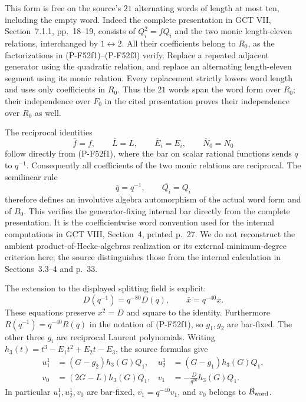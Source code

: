 This form is free on the source's $21$ alternating words of
length at most ten, including the empty word. Indeed the
complete presentation in GCT VII, Section~7.1.1, pp.~18--19,
consists of $Q_i^2=fQ_i$ and the two monic length-eleven
relations, interchanged by $1\leftrightarrow2$.
All their coefficients belong to $R_0$, as the factorizations
in (P-F52f1)--(P-F52f3) verify. Replace a repeated adjacent
generator using the quadratic relation, and replace an
alternating length-eleven segment using its monic relation.
Every replacement strictly lowers word length and uses only
coefficients in $R_0$. Thus the $21$ words span the word
form over $R_0$; their independence over $F_0$ in the cited
presentation proves their independence over $R_0$ as well.

The reciprocal identities
\[
 \overline f=f,\qquad \overline L=L,\qquad
 \overline E_i=E_i,\qquad \overline N_0=N_0
                                                               \tag{P-F52aj}
\]
follow directly from (P-F52f1), where the bar on scalar
rational functions sends $q$ to $q^{-1}$.
Consequently all coefficients of the two monic relations
are reciprocal. The semilinear rule
\[
             \overline q=q^{-1},\qquad
             \overline {Q_i}=Q_i
                                                               \tag{P-F52ak}
\]
therefore defines an involutive algebra automorphism of
the actual word form and of $B_0$.
This verifies the generator-fixing internal bar directly from
the complete presentation. It is the coefficientwise word
convention used for the internal computations in GCT VIII,
Section~4, printed p.~27. We do not reconstruct the ambient
product-of-Hecke-algebras realization or its external
minimum-degree criterion here; the source distinguishes those
from the internal calculation in Sections~3.3--4 and p.~33.

The extension to the displayed splitting field is explicit:
\[
             D(q^{-1})=q^{-80}D(q),\qquad
             \overline x=q^{-40}x.
                                                               \tag{P-F52al}
\]
These equations preserve $x^2=D$ and square to the identity.
Furthermore $R(q^{-1})=q^{-40}R(q)$ in the notation of
(P-F52f1), so $g_1,g_2$ are bar-fixed. The other three
$g_i$ are reciprocal Laurent polynomials.
Writing $h_3(t)=t^3-E_1t^2+E_2t-E_3$, the source formulas
give
\[
 \begin{aligned}
 u_1^1&=(G-g_2)h_3(G)Q_1,
       &u_2^1&=(G-g_1)h_3(G)Q_1,\\
 v_0&=(2G-L)h_3(G)Q_1,
       &v_1&=-\frac{D}{q^{20}}h_3(G)Q_1.
 \end{aligned}                                                  \tag{P-F52am}
\]
In particular $u_1^1,u_2^1,v_0$ are bar-fixed,
$\overline {v_1}=q^{-40}v_1$, and $v_0$ belongs to
$\mathcal B_{\rm word}$.

